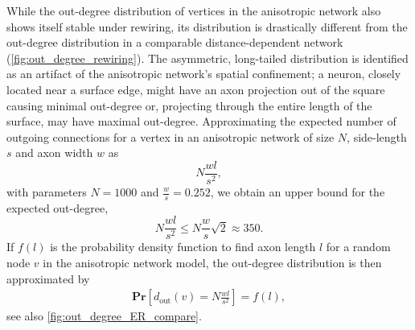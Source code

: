 While the out-degree distribution of vertices in the anisotropic
network also shows itself stable under rewiring, its distribution is
drastically different from the out-degree distribution in a comparable
distance-dependent network (\autoref{fig:out_degree_rewiring}). The
asymmetric, long-tailed distribution is identified as an artifact of
the anisotropic network's spatial confinement; a neuron, closely
located near a surface edge, might have an axon projection out of the
square causing minimal out-degree or, projecting through the entire
length of the surface, may have maximal out-degree. Approximating the
expected number of outgoing connections for a vertex in an anisotropic
network of size $N$, side-length $s$ and axon width $w$ as
\[
  N \frac{w l}{s^2},
\]
with parameters $N = 1000$ and $\frac{w}{s} = 0.252$, we obtain an
upper bound for the expected out-degree, 
\[
  N \frac{w l}{s^2} \leq N\frac{w}{s} \sqrt{2} \approx 350.
\]
If $f(l)$ is the probability density function to find axon length $l$
for a random node $v$ in the anisotropic network model, the out-degree
distribution is then approximated by
%
\begin{align}\label{eq:axon_length_approx}
  \mathbf{Pr}[d_{\mathrm{out}}(v) = N \frac{w l}{s^2}] = f(l),  
\end{align}
%
see also \autoref{fig:out_degree_ER_compare}.

